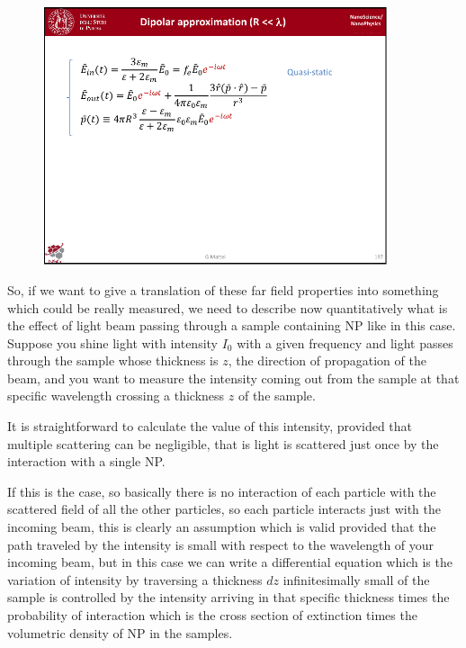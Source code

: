 \documentclass[../main/main.tex]{subfiles}
\begin{document}
\begin{figure}[h!]
\centering
\includegraphics[page=10,width=0.9\textwidth]{../lessons/pdf_file/12_lesson.pdf}
\end{figure}


So, if we want to give a translation of these far field properties into something which could be really measured, we need to describe now quantitatively what is the effect of light beam passing through a sample containing NP like in this case. Suppose you shine light with intensity $I_0$ with a given frequency and light passes through the sample  whose thickness is $z$, the direction of propagation of the beam, and you want to measure the intensity coming out from the sample at that specific wavelength crossing a thickness $z$ of the sample.

It is straightforward to calculate the value of this intensity, provided that multiple scattering can be negligible, that is light is scattered just once by the interaction with a single NP. 

If this is the case, so basically there is no interaction of each particle with the scattered field of all the other particles, so each particle interacts just with the incoming beam, this is clearly an assumption which is valid provided that the path traveled by the intensity is small with respect to the wavelength of your incoming beam, but in this case we can write a differential equation which is the variation of intensity by traversing a thickness $dz$ infinitesimally small of the sample is controlled by the intensity arriving in that specific thickness times the probability of interaction which is the cross section of extinction times the volumetric density of NP in the samples.
\end{document}
